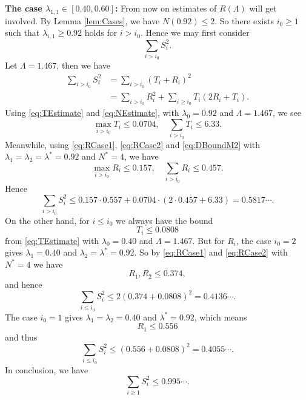 \documentclass[10pt, reqno]{amsart}
\numberwithin{equation}{section}
\newcommand{\bb}[1]{\left(#1\right)}
\begin{document}
\textbf{The case $\lambda_{1,1}\in [0.40,0.60]$:}
From now on estimates of $R(\Lambda)$ will get involved. By Lemma \ref{lem:Cases}, we have $N(0.92)\leq 2$. So there exists $i_0\geq 1$ such that $\lambda_{i,1}\geq 0.92$ holds for $i>i_0$. Hence we may first consider
\begin{equation}\label{eq:SumLargei}
\sum_{i>i_0}S_i^2.
\end{equation}
Let $\Lambda=1.467$, then we have
\begin{equation}\label{eq:DecompositionLarge}
\begin{split}
\sum_{i>i_0}S_i^2&=\sum_{i>i_0}(T_i+R_i)^2 \\
&=\sum_{i>i_0}R_i^2+\sum_{i\geq i_0}T_i\bb{2R_i+T_i}.
\end{split}
\end{equation}
Using \eqref{eq:TEstimate} and \eqref{eq:NEstimate}, with $\lambda_0=0.92$ and $\Lambda=1.467$, we see
\begin{equation}\label{eq:TiLarge}
\max_{i>i_0}T_i\leq 0.0704,\quad \sum_{i>i_0}T_i\leq 6.33.
\end{equation}
Meanwhile, using \eqref{eq:RCase1}, \eqref{eq:RCase2} and \eqref{eq:DBoundM2} with $\lambda_1=\lambda_2=\lambda^*=0.92$ and $N^*=4$, we have
\begin{equation}\label{eq:RiLarge}
\max_{i>i_0} R_i\leq 0.157,\quad \sum_{i>i_0} R_i\leq 0.457.
\end{equation}
Hence
\begin{equation}\label{eq:FinalLarge}
\sum_{i>i_0}S_i^2\leq 0.157\cdot 0.557+0.0704\cdot (2\cdot 0.457+6.33)=0.5817\cdots.
\end{equation}
On the other hand, for $i\leq i_0$ we always have the bound
\begin{equation}\label{eq:TiSmall}
T_i\leq 0.0808
\end{equation}
from \eqref{eq:TEstimate} with $\lambda_0=0.40$ and $\Lambda=1.467.$ But for $R_i$, the case $i_0=2$ gives $\lambda_1=0.40$ and $\lambda_2=\lambda^*=0.92$. So by \eqref{eq:RCase1} and \eqref{eq:RCase2} with $N^*=4$ we have
\begin{equation}\label{eq:RiSmall1}
R_1,R_2\leq 0.374,
\end{equation}
and hence
\begin{equation}\label{eq:FinalSmall1}
\sum_{i\leq i_0}S_i^2\leq 2(0.374+0.0808)^2=0.4136\cdots.
\end{equation}
The case $i_0=1$ gives $\lambda_1=\lambda_2=0.40$ and $\lambda^*=0.92$, which means
\begin{equation}\label{eq:RiSmall2}
R_1\leq 0.556
\end{equation}
and thus
\begin{equation}\label{eq:FinalSmall2}
\sum_{i\leq i_0}S_i^2\leq (0.556+0.0808)^2=0.4055\cdots.
\end{equation}
In conclusion, we have
\begin{equation}\label{eq:FinalCase3}
\sum_{i\geq 1} S_i^2\leq 0.995\cdots.
\end{equation}
\end{document}
